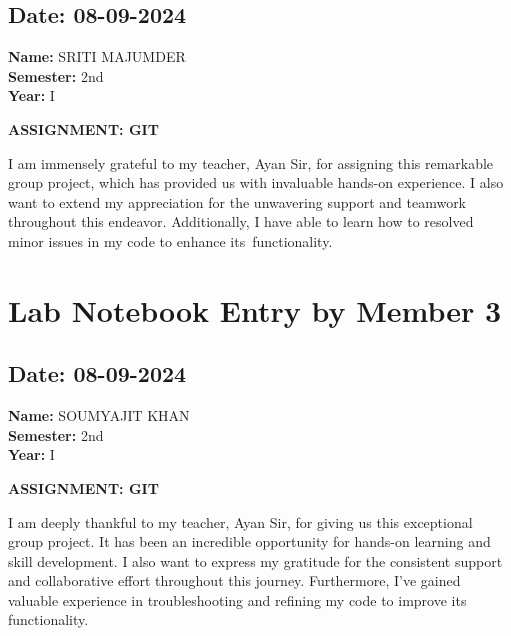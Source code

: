 \documentclass[12pt]{article}
\begin{document}
\subsection*{Date: 08-09-2024}

\begin{flushright}
\textbf{Name:} SRITI MAJUMDER \\
\textbf{Semester:} 2nd \\
\textbf{Year:} I \\
\end{flushright}

\begin{center}
\Huge \textbf{ASSIGNMENT: GIT}
\end{center}

I am immensely grateful to my teacher, Ayan Sir, for assigning this remarkable group project, which has provided us with invaluable hands-on experience. I also want to extend my appreciation for the unwavering support and teamwork throughout this endeavor. Additionally, I have able to learn how to  resolved minor issues in my  code to enhance its functionality.

\newpage

\section{Lab Notebook Entry by Member 3}
\subsection*{Date: 08-09-2024}

\begin{flushright}
\textbf{Name:} SOUMYAJIT KHAN \\
\textbf{Semester:} 2nd \\
\textbf{Year:} I \\
\end{flushright}

\begin{center}
\Huge \textbf{ASSIGNMENT: GIT}
\end{center}

I am deeply thankful to my teacher, Ayan Sir, for giving us this exceptional group project. It has been an incredible opportunity for hands-on learning and skill development. I also want to express my gratitude for the consistent support and collaborative effort throughout this journey. Furthermore, I've gained valuable experience in troubleshooting and refining my code to improve its functionality.
\end{document}
